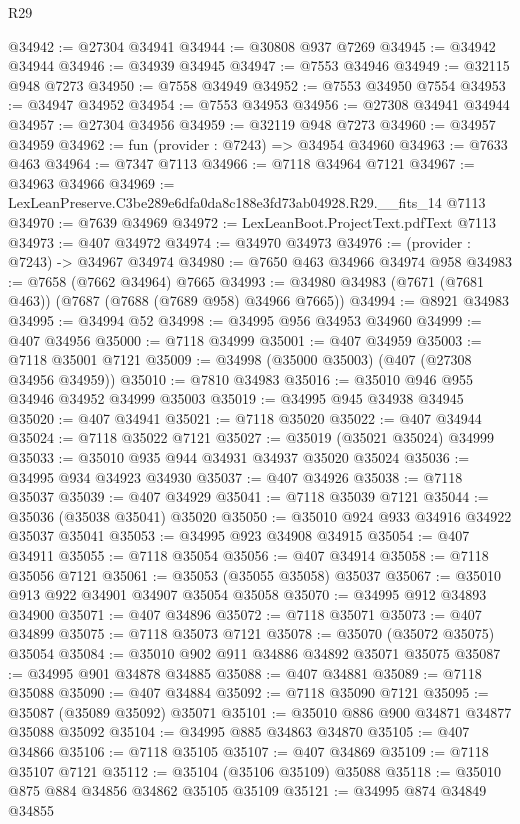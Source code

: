 \begin{lexlean}{R29}
\begin{coremodule}
@34942 := @27304 @34941
@34944 := @30808 @937 @7269
@34945 := @34942 @34944
@34946 := @34939 @34945
@34947 := @7553 @34946
@34949 := @32115 @948 @7273
@34950 := @7558 @34949
@34952 := @7553 @34950 @7554
@34953 := @34947 @34952
@34954 := @7553 @34953
@34956 := @27308 @34941 @34944
@34957 := @27304 @34956
@34959 := @32119 @948 @7273
@34960 := @34957 @34959
@34962 := fun (provider : @7243) => @34954 @34960
@34963 := @7633 @463
@34964 := @7347 @7113
@34966 := @7118 @34964 @7121
@34967 := @34963 @34966
@34969 := LexLeanPreserve.C3be289e6dfa0da8c188e3fd73ab04928.R29.__fits_14 @7113
@34970 := @7639 @34969
@34972 := LexLeanBoot.ProjectText.pdfText @7113
@34973 := @407 @34972
@34974 := @34970 @34973
@34976 := (provider : @7243) -> @34967 @34974
@34980 := @7650 @463 @34966 @34974 @958
@34983 := @7658 (@7662 @34964) @7665
@34993 := @34980 @34983 (@7671 (@7681 @463)) (@7687 (@7688 (@7689 @958) @34966 @7665))
@34994 := @8921 @34983
@34995 := @34994 @52
@34998 := @34995 @956 @34953 @34960
@34999 := @407 @34956
@35000 := @7118 @34999
@35001 := @407 @34959
@35003 := @7118 @35001 @7121
@35009 := @34998 (@35000 @35003) (@407 (@27308 @34956 @34959))
@35010 := @7810 @34983
@35016 := @35010 @946 @955 @34946 @34952 @34999 @35003
@35019 := @34995 @945 @34938 @34945
@35020 := @407 @34941
@35021 := @7118 @35020
@35022 := @407 @34944
@35024 := @7118 @35022 @7121
@35027 := @35019 (@35021 @35024) @34999
@35033 := @35010 @935 @944 @34931 @34937 @35020 @35024
@35036 := @34995 @934 @34923 @34930
@35037 := @407 @34926
@35038 := @7118 @35037
@35039 := @407 @34929
@35041 := @7118 @35039 @7121
@35044 := @35036 (@35038 @35041) @35020
@35050 := @35010 @924 @933 @34916 @34922 @35037 @35041
@35053 := @34995 @923 @34908 @34915
@35054 := @407 @34911
@35055 := @7118 @35054
@35056 := @407 @34914
@35058 := @7118 @35056 @7121
@35061 := @35053 (@35055 @35058) @35037
@35067 := @35010 @913 @922 @34901 @34907 @35054 @35058
@35070 := @34995 @912 @34893 @34900
@35071 := @407 @34896
@35072 := @7118 @35071
@35073 := @407 @34899
@35075 := @7118 @35073 @7121
@35078 := @35070 (@35072 @35075) @35054
@35084 := @35010 @902 @911 @34886 @34892 @35071 @35075
@35087 := @34995 @901 @34878 @34885
@35088 := @407 @34881
@35089 := @7118 @35088
@35090 := @407 @34884
@35092 := @7118 @35090 @7121
@35095 := @35087 (@35089 @35092) @35071
@35101 := @35010 @886 @900 @34871 @34877 @35088 @35092
@35104 := @34995 @885 @34863 @34870
@35105 := @407 @34866
@35106 := @7118 @35105
@35107 := @407 @34869
@35109 := @7118 @35107 @7121
@35112 := @35104 (@35106 @35109) @35088
@35118 := @35010 @875 @884 @34856 @34862 @35105 @35109
@35121 := @34995 @874 @34849 @34855

\end{coremodule}
\end{lexlean}
